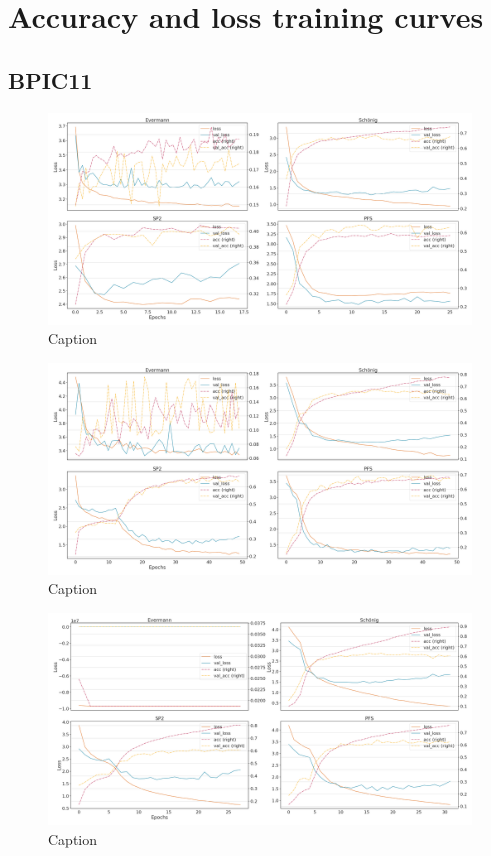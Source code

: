 \chapter{Accuracy and loss training curves}
\label{appendix:loss-curves}

\section{BPIC11}
\begin{figure}[!htb]
    \centering
    \includegraphics[width=\textwidth]{gfx/bpic2011/individual_loss_acc_curve.png}
    \caption{Caption}
    \label{fig:my_label}
\end{figure}
\begin{figure}[!htb]
    \centering
    \includegraphics[width=\textwidth]{gfx/bpic2011/grouped_loss_acc_curve.png}
    \caption{Caption}
    \label{fig:my_label}
\end{figure}
\begin{figure}[!htb]
    \centering
    \includegraphics[width=\textwidth]{gfx/bpic2011/padded_loss_acc_curve.png}
    \caption{Caption}
    \label{fig:my_label}
\end{figure}
